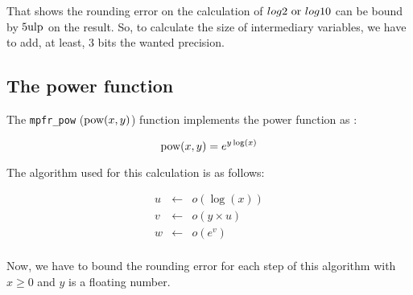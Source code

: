 \documentclass[12pt]{amsart}
\def\n{\textnormal}
\def\ulp{{\rm ulp}}
\begin{document}
That shows the rounding error on the calculation of $log2 \n{ or }
log10$ can be bound by $ 5 \ulp$ on the result. So, to calculate the
size of intermediary variables, we have to add, at least, 3 bits the
wanted precision.


\subsection{The power function}

The {\tt mpfr\_pow} ($\n{pow}(x,y)$) function implements the power function  as :

\[
\textnormal{pow} (x,y) = e^{y \log(x)}
\]

The algorithm used for this calculation is as follows:

\begin{eqnarray}\nonumber
u&\leftarrow&o(\log(x))\\\nonumber
v&\leftarrow&o(y \times u)\\\nonumber
w&\leftarrow&o(e^v)\\\nonumber
\end{eqnarray}

Now, we have to bound the rounding error for each step of this
algorithm with $x \geq 0$ and $y$ is a floating number.
\end{document}
